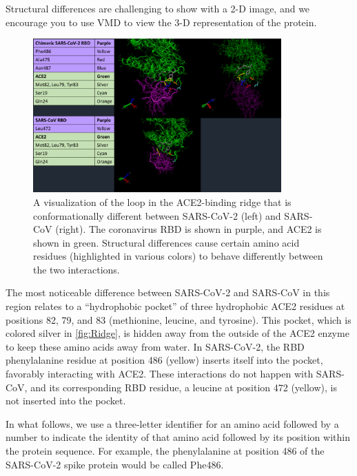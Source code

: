 Structural differences are challenging to show with a 2-D image, and we encourage you to use VMD to view the 3-D representation of the protein. \\

\begin{qbox}\end{qbox}

\begin{figure}[h]
	\centering
	\mySfFamily
	\includegraphics[width = 0.85\textwidth]{../images/Ridge.png}
	\caption{A visualization of the loop in the ACE2-binding ridge that is conformationally different between SARS-CoV-2 (left) and SARS-CoV (right). The coronavirus RBD is shown in purple, and ACE2 is shown in green. Structural differences cause certain amino acid residues (highlighted in various colors) to behave differently between the two interactions.}
	\label{fig:Ridge}
\end{figure}

The most noticeable difference between SARS-CoV-2 and SARS-CoV in this region relates to a ``hydrophobic pocket'' of three hydrophobic ACE2 residues at positions 82, 79, and 83 (methionine, leucine, and tyrosine). This pocket, which is colored silver in \autoref{fig:Ridge}, is hidden away from the outside of the ACE2 enzyme to keep these amino acids away from water. In SARS-CoV-2, the RBD phenylalanine residue at position 486 (yellow) inserts itself into the pocket, favorably interacting with ACE2. These interactions do not happen with SARS-CoV, and its corresponding RBD residue, a leucine at position 472 (yellow), is not inserted into the pocket.

In what follows, we use a three-letter identifier for an amino acid followed by a number to indicate the identity of that amino acid followed by its position within the protein sequence. For example, the phenylalanine at position 486 of the SARS-CoV-2 spike protein would be called Phe486.

